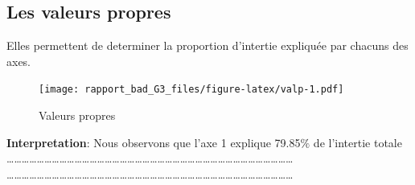 \documentclass[
]{article}
\newenvironment{Shaded}{\begin{snugshade}}{\end{snugshade}}
\newcommand{\DataTypeTok}[1]{\textcolor[rgb]{0.13,0.29,0.53}{#1}}
\newcommand{\DecValTok}[1]{\textcolor[rgb]{0.00,0.00,0.81}{#1}}
\newcommand{\FloatTok}[1]{\textcolor[rgb]{0.00,0.00,0.81}{#1}}
\newcommand{\KeywordTok}[1]{\textcolor[rgb]{0.13,0.29,0.53}{\textbf{#1}}}
\newcommand{\NormalTok}[1]{#1}
\newcommand{\OperatorTok}[1]{\textcolor[rgb]{0.81,0.36,0.00}{\textbf{#1}}}
\newcommand{\StringTok}[1]{\textcolor[rgb]{0.31,0.60,0.02}{#1}}
\begin{document}
\hypertarget{les-valeurs-propres}{%
\subsection{\texorpdfstring{\textbf{Les valeurs
propres}}{Les valeurs propres}}\label{les-valeurs-propres}}

Elles permettent de determiner la proportion d'intertie expliquée par
chacuns des axes.

\begin{Shaded}
\end{Shaded}

\begin{figure}
\centering
\texttt{[image: rapport\_bad\_G3\_files/figure-latex/valp-1.pdf]}
\caption{Valeurs propres}
\end{figure}

\textbf{Interpretation}: Nous observons que l'axe 1 explique 79.85\(\%\)
de l'intertie totale\\
\ldots\ldots\ldots\ldots\ldots\ldots\ldots\ldots\ldots\ldots\ldots\ldots\ldots\ldots\ldots\ldots\ldots\ldots\ldots\ldots\ldots\ldots\ldots\ldots\ldots\ldots\ldots\ldots\ldots\ldots\ldots\ldots\ldots\ldots\ldots\ldots\ldots\ldots{}
\ldots\ldots\ldots\ldots\ldots\ldots\ldots\ldots\ldots\ldots\ldots\ldots\ldots\ldots\ldots\ldots\ldots\ldots\ldots\ldots\ldots\ldots\ldots\ldots\ldots\ldots\ldots\ldots\ldots\ldots\ldots\ldots\ldots\ldots\ldots\ldots\ldots\ldots{}
\end{document}
